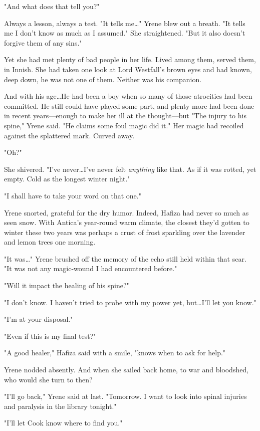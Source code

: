 "And what does that tell you?"

Always a lesson, always a test. "It tells me\ldots" Yrene blew out a breath. "It tells me I don't know as much as I assumed." She straightened. "But it also doesn't forgive them of any sins."

Yet she had met plenty of bad people in her life. Lived among them, served them, in Innish. She had taken one look at Lord Westfall's brown eyes and had known, deep down, he was not one of them. Neither was his companion.

And with his age\ldots He had been a boy when so many of those atrocities had been committed. He still could have played some part, and plenty more had been done in recent years---enough to make her ill at the thought---but  "The injury to his spine," Yrene said. "He claims some foul magic did it." Her magic had recoiled against the splattered mark. Curved away.

"Oh?"

She shivered. "I've never\ldots I've never felt \emph{anything} like that. As if it was rotted, yet empty. Cold as the longest winter night."

"I shall have to take your word on that one."

Yrene snorted, grateful for the dry humor. Indeed, Hafiza had never so much as seen snow. With Antica's year-round warm climate, the closest they'd gotten to winter these two years was perhaps a crust of frost sparkling over the lavender and lemon trees one morning.

"It was\ldots" Yrene brushed off the memory of the echo still held within that scar. "It was not any magic-wound I had encountered before."

"Will it impact the healing of his spine?"

"I don't know. I haven't tried to probe with my power yet, but\ldots I'll let you know."

"I'm at your disposal."

"Even if this is my final test?"

"A good healer," Hafiza said with a smile, "knows when to ask for help."

Yrene nodded absently. And when she sailed back home, to war and bloodshed, who would she turn to then?

"I'll go back," Yrene said at last. "Tomorrow. I want to look into spinal injuries and paralysis in the library tonight."

"I'll let Cook know where to find you."

